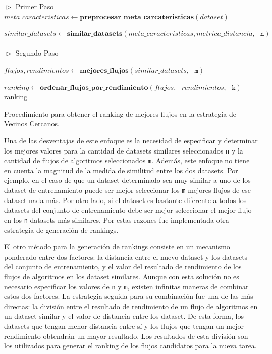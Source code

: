 \begin{algorithm}
	\begin{algorithmic}
		 \State $\vartriangleright$ Primer Paso
		 \State $meta\_caracteristicas \gets \textbf{preprocesar\_meta\_carcateristicas}(dataset)$
		
		 \State $similar\_datasets \gets \textbf{similar\_datasets}(meta\_caracteristicas, metrica\_distancia,\text{ }\texttt{n})$  \\\\
		 
		 $\vartriangleright$ Segundo Paso 
		 
		 \State $flujos, rendimientos \gets \textbf{mejores\_flujos}(similar\_datasets,\text{ }\texttt{m}) $
		 
		 \State $ranking \gets \textbf{ordenar\_flujos\_por\_rendimiento}(flujos,\text{ }rendimientos,\text{ } \texttt{k})$ \\
		 \Return ranking
	\end{algorithmic}
	\caption{Procedimiento para obtener el ranking de mejores flujos en la estrategia de Vecinos Cercanos.}
	\label{alg:nn.proc}
\end{algorithm}

Una de las desventajas de este enfoque es la necesidad de especificar y determinar los mejores valores para la cantidad de datasets similares seleccionados \texttt{n} y la cantidad de flujos de algoritmos seleccionados \texttt{m}. Además, este enfoque no tiene en cuenta la magnitud de la medida de similitud entre los dos datasets. Por ejemplo, en el caso de que un dataset determinado sea muy similar a uno de los dataset de entrenamiento puede ser mejor seleccionar los \texttt{m} mejores flujos de ese dataset nada más. Por otro lado, si el dataset es bastante diferente a todos los datasets del conjunto de entrenamiento debe ser mejor seleccionar el mejor flujo en los \texttt{n} datasets más similares. Por estas razones fue implementada otra estrategia de generación de rankings. 

El otro método para la generación de rankings consiste en un mecanismo ponderado entre dos factores: la distancia entre el nuevo dataset y los datasets del conjunto de entrenamiento, y el valor del resultado de rendimiento de los flujos de algoritmos en los dataset similares. Aunque con esta solución no es necesario especificar los valores de \texttt{n} y \texttt{m}, existen infinitas maneras de combinar estos dos factores. La estrategia seguida para su combinación fue una de las más directas: la división entre el resultado de rendimiento de un flujo de algoritmos en un dataset similar y el valor de distancia entre los dataset. De esta forma, los datasets que tengan menor distancia entre sí y los flujos que tengan un mejor rendimiento obtendrán un mayor resultado. Los resultados de esta división son los utilizados para generar el ranking de los flujos candidatos para la nueva tarea.

